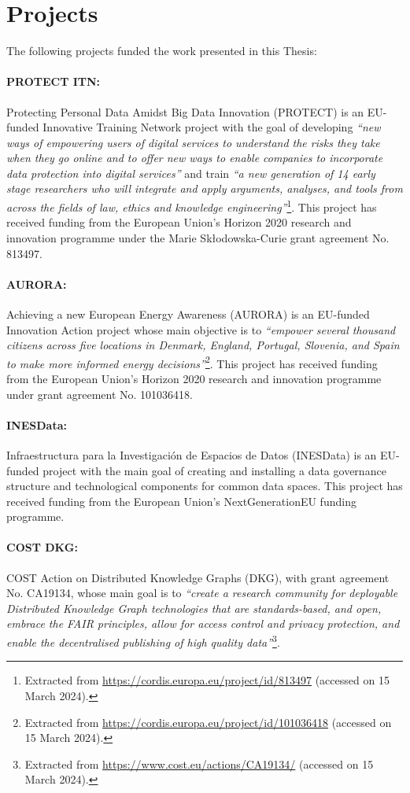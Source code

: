 \section{Projects}
\label{sec:projects}

The following projects funded the work presented in this Thesis:

\paragraph{PROTECT ITN:} Protecting Personal Data Amidst Big Data Innovation (PROTECT) is an EU-funded Innovative Training Network project with the goal of developing \textit{``new ways of empowering users of digital services to understand the risks they take when they go online and to offer new ways to enable companies to incorporate data protection into digital services''} and train \textit{``a new generation of 14 early stage researchers who will integrate and apply arguments, analyses, and tools from across the fields of law, ethics and knowledge engineering''}\footnote{Extracted from \url{https://cordis.europa.eu/project/id/813497} (accessed on 15 March 2024).}. This project has received funding from the European Union’s Horizon 2020 research and innovation programme under the Marie Skłodowska-Curie grant agreement No. 813497.

\paragraph{AURORA:} Achieving a new European Energy Awareness (AURORA) is an EU-funded Innovation Action project whose main objective is to \textit{``empower several thousand citizens across five locations in Denmark, England, Portugal, Slovenia, and Spain to make more informed energy decisions''}\footnote{Extracted from \url{https://cordis.europa.eu/project/id/101036418} (accessed on 15 March 2024).}. This project has received funding from the European Union’s Horizon 2020 research and innovation programme under grant agreement No. 101036418.

\paragraph{INESData:} Infraestructura para la Investigación de Espacios de Datos (INESData) is an EU-funded project with the main goal of creating and installing a data governance structure and technological components for common data spaces. This project has received funding from the European Union’s NextGenerationEU funding programme.

\paragraph{COST DKG:} COST Action on Distributed Knowledge Graphs (DKG), with grant agreement No. CA19134, whose main goal is to \textit{``create a research community for deployable Distributed Knowledge Graph technologies that are standards-based, and open, embrace the FAIR principles, allow for access control and privacy protection, and enable the decentralised publishing of high quality data''}\footnote{Extracted from \url{https://www.cost.eu/actions/CA19134/} (accessed on 15 March 2024).}.